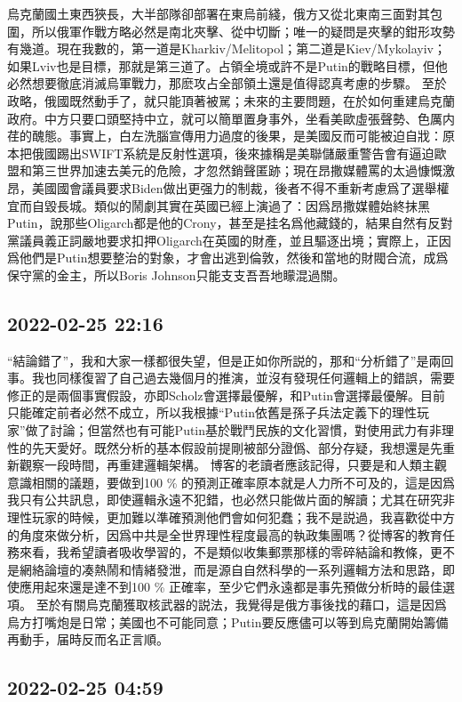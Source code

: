 \documentclass[twocolumn]{ctexart}
\begin{document}
烏克蘭國土東西狹長，大半部隊卻部署在東烏前綫，俄方又從北東南三面對其包圍，所以俄軍作戰方略必然是南北夾擊、從中切斷；唯一的疑問是夾擊的鉗形攻勢有幾道。現在我數的，第一道是Kharkiv/Melitopol；第二道是Kiev/Mykolayiv；如果Lviv也是目標，那就是第三道了。占領全境或許不是Putin的戰略目標，但他必然想要徹底消滅烏軍戰力，那麽攻占全部領土還是值得認真考慮的步驟。
至於政略，俄國既然動手了，就只能頂著被駡；未來的主要問題，在於如何重建烏克蘭政府。中方只要口頭堅持中立，就可以簡單置身事外，坐看美歐虛張聲勢、色厲内荏的醜態。事實上，白左洗腦宣傳用力過度的後果，是美國反而可能被迫自戕：原本把俄國踢出SWIFT系統是反射性選項，後來據稱是美聯儲嚴重警告會有逼迫歐盟和第三世界加速去美元的危險，才忽然銷聲匿跡；現在昂撒媒體罵的太過慷慨激昂，美國國會議員要求Biden做出更强力的制裁，後者不得不重新考慮爲了選舉權宜而自毀長城。類似的鬧劇其實在英國已經上演過了：因爲昂撒媒體始終抹黑Putin，說那些Oligarch都是他的Crony，甚至是挂名爲他藏錢的，結果自然有反對黨議員義正詞嚴地要求扣押Oligarch在英國的財產，並且驅逐出境；實際上，正因爲他們是Putin想要整治的對象，才會出逃到倫敦，然後和當地的財閥合流，成爲保守黨的金主，所以Boris Johnson只能支支吾吾地矇混過關。
\subsection*{2022-02-25 22:16}

“結論錯了”，我和大家一樣都很失望，但是正如你所説的，那和“分析錯了”是兩回事。我也同樣復習了自己過去幾個月的推演，並沒有發現任何邏輯上的錯誤，需要修正的是兩個事實假設，亦即Scholz會選擇最優解，和Putin會選擇最優解。目前只能確定前者必然不成立，所以我根據“Putin依舊是孫子兵法定義下的理性玩家”做了討論；但當然也有可能Putin基於戰鬥民族的文化習慣，對使用武力有非理性的先天愛好。既然分析的基本假設前提剛被部分證僞、部分存疑，我想還是先重新觀察一段時間，再重建邏輯架構。
博客的老讀者應該記得，只要是和人類主觀意識相關的議題，要做到100 \% 的預測正確率原本就是人力所不可及的，這是因爲我只有公共訊息，即使邏輯永遠不犯錯，也必然只能做片面的解讀；尤其在研究非理性玩家的時候，更加難以準確預測他們會如何犯蠢；我不是説過，我喜歡從中方的角度來做分析，因爲中共是全世界理性程度最高的執政集團嗎？從博客的教育任務來看，我希望讀者吸收學習的，不是類似收集郵票那樣的零碎結論和教條，更不是網絡論壇的凑熱鬧和情緒發泄，而是源自自然科學的一系列邏輯方法和思路，即使應用起來還是達不到100 \% 正確率，至少它們永遠都是事先預做分析時的最佳選項。
至於有關烏克蘭獲取核武器的説法，我覺得是俄方事後找的藉口，這是因爲烏方打嘴炮是日常；美國也不可能同意；Putin要反應儘可以等到烏克蘭開始籌備再動手，届時反而名正言順。
\subsection*{2022-02-25 04:59}
\end{document}
